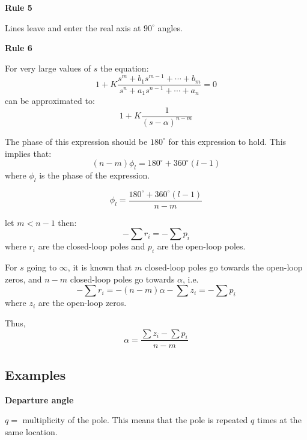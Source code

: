 \textbf{Rule 5}

Lines leave and enter the real axis at $90^\circ$ angles.

\textbf{Rule 6}

For very large values of $s$ the equation:
$$1+K\frac{s^m+b_1s^{m-1}+\cdots+b_m}{s^n+a_1s^{n-1}+\cdots+a_n} = 0$$
can be approximated to:
$$1+K\frac{1}{(s-\alpha)^{n-m}}$$

The phase of this expression should be $180^\circ$ for this expression to hold.
This implies that:
$$(n-m)\phi_l = 180^\circ+360^\circ(l-1)$$
where $\phi_l$ is the phase of the expression.

$$\phi_l = \frac{180^\circ+360^\circ(l-1)}{n-m}$$


let $m<n-1$ then:
$$-\sum r_i = -\sum p_i$$
where $r_i$ are the closed-loop poles and $p_i$ are the open-loop poles.

For $s$ going to $\infty$, it is known that $m$ closed-loop poles go towards the open-loop zeros,
and $n-m$ closed-loop poles go towards $\alpha$, i.e.
$$-\sum r_i = -(n-m)\alpha - \sum z_i = -\sum p_i$$
where $z_i$ are the open-loop zeros.

Thus,
$$\alpha = \frac{\sum z_i - \sum p_i}{n-m}$$

\subsection{Examples}


\textbf{Departure angle}

$q=$ multiplicity of the pole. This means that the pole is repeated $q$ times
at the same location.
